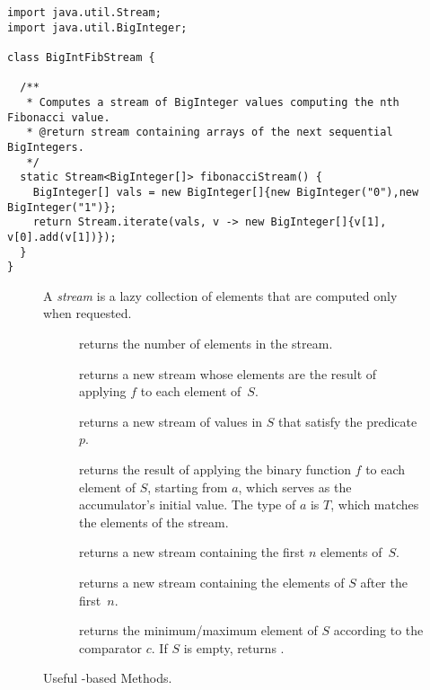 \begin{cl}[]{}
\begin{lstlisting}[language=MyJava]
import java.util.Stream;
import java.util.BigInteger;

class BigIntFibStream {

  /**
   * Computes a stream of BigInteger values computing the nth Fibonacci value.
   * @return stream containing arrays of the next sequential BigIntegers.
   */
  static Stream<BigInteger[]> fibonacciStream() {
    BigInteger[] vals = new BigInteger[]{new BigInteger("0"),new BigInteger("1")};
    return Stream.iterate(vals, v -> new BigInteger[]{v[1], v[0].add(v[1])});
  }
}
\end{lstlisting}
\end{cl}

\begin{figure}[tp]
  \small
  \begin{tcolorbox}[title=Java Streams]
    A \emph{stream} is a lazy collection of elements that are computed only when requested.
    \vspace{2ex}
  \begin{description}
    \item [] returns the number of elements in the stream.
    \item [] returns a new stream whose elements are the result of applying $f$ to each element of~$S$.
    \item [] returns a new stream of values in $S$ that satisfy the predicate~$p$.
    \item [] returns the result of applying the binary function $f$ to each element of $S$, starting from $a$, which serves as the accumulator's initial value. The type of $a$ is $T$, which matches the elements of the stream.
    \item [] returns a new stream containing the first $n$ elements of~$S$.
    \item [] returns a new stream containing the elements of $S$ after the first~$n$.
    \item [] returns the minimum/maximum element of $S$ according to the comparator $c$. If $S$ is empty, returns .
  \end{description}
\end{tcolorbox}
  \caption{Useful -based Methods.}
  \label{fig:streams}
\end{figure}

